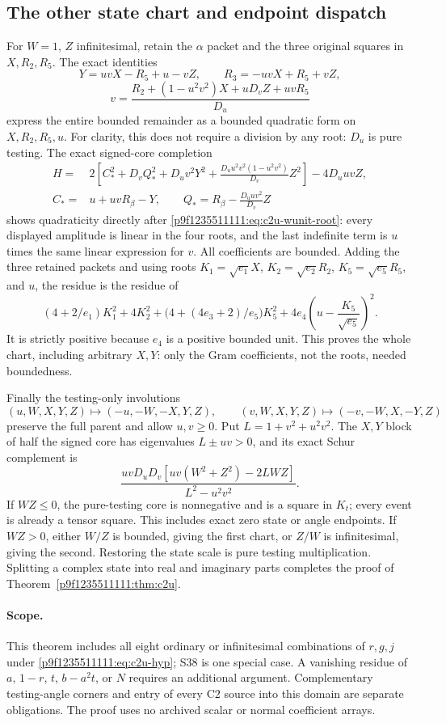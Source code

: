 \subsection{The other state chart and endpoint dispatch}
For $W=1$, $Z$ infinitesimal, retain the $\alpha$ packet and the three
original squares in $X,R_2,R_5$. The exact identities
\[
Y=uvX-R_5+u-vZ,\qquad R_3=-uvX+R_5+vZ,
\]
\begin{equation}
v=\frac{R_2+(1-u^2v^2)X+uD_vZ+uvR_5}{D_u}
\label{p9f1235511111:eq:c2u-wunit-root}
\end{equation}
express the entire bounded remainder as a bounded quadratic form on
$X,R_2,R_5,u$. For clarity, this does not require a division by any
root: $D_u$ is pure testing. The exact signed-core completion
\[
\begin{split}
H={}&2\left[C_*^2+D_vQ_*^2+D_uv^2Y^2
 +\frac{D_uu^2v^2(1-u^2v^2)}{D_v}Z^2\right]-4D_uuvZ,\\
C_*={}&u+uvR_\beta-Y,\qquad
Q_*=R_\beta-\frac{D_uuv^2}{D_v}Z
\end{split}
\]
shows quadraticity directly after \eqref{p9f1235511111:eq:c2u-wunit-root}: every
displayed amplitude is linear in the four roots, and the last indefinite
term is $u$ times the same linear expression for $v$. All coefficients
are bounded. Adding the three retained packets and using roots
$K_1=\sqrt{e_1}X$, $K_2=\sqrt{e_2}R_2$,
$K_5=\sqrt{e_5}R_5$, and $u$, the residue is the residue of
\[
(4+2/e_1)K_1^2+4K_2^2+
\bigl(4+(4e_3+2)/e_5\bigr)K_5^2
+4e_4\left(u-\frac{K_5}{\sqrt{e_5}}\right)^2.
\]
It is strictly positive because $e_4$ is a positive bounded unit.  This
proves the whole chart, including arbitrary $X,Y$: only the Gram
coefficients, not the roots, needed boundedness.

Finally the testing-only involutions
\[
(u,W,X,Y,Z)\mapsto(-u,-W,-X,Y,Z),\qquad
(v,W,X,Y,Z)\mapsto(-v,-W,X,-Y,Z)
\]
preserve the full parent and allow $u,v\ge0$. Put
$L=1+v^2+u^2v^2$. The $X,Y$ block of half the signed core has eigenvalues
$L\pm uv>0$, and its exact Schur complement is
\begin{equation}
 \frac{uvD_uD_v[uv(W^2+Z^2)-2LWZ]}{L^2-u^2v^2}.
\label{p9f1235511111:eq:c2u-core-schur}
\end{equation}
If $WZ\le0$, the pure-testing core is nonnegative and is a square in
$K_t$; every event is already a tensor square. This includes exact zero
state or angle endpoints. If $WZ>0$, either $W/Z$ is bounded, giving
the first chart, or $Z/W$ is infinitesimal, giving the second. Restoring
the state scale is pure testing multiplication. Splitting a complex
state into real and imaginary parts completes the proof of
Theorem~\ref{p9f1235511111:thm:c2u}.

\paragraph{Scope.}
This theorem includes all eight ordinary or infinitesimal combinations
of $r,g,j$ under \eqref{p9f1235511111:eq:c2u-hyp}; S38 is one special case.
A vanishing residue of $a$, $1-r$, $t$, $b-a^2t$, or $N$ requires
an additional argument.  Complementary testing-angle corners and
entry of every C2 source into this domain are separate obligations.
The proof uses no archived scalar or normal coefficient arrays.
